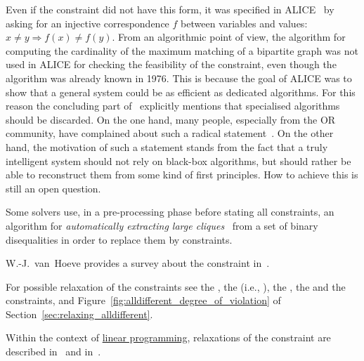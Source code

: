 \begin{ctrdesc}
\item[\pdfmarkup{subject={Remark},color=white,markup=Highlight}{Remark}{Miscellaneous comments about the constraint that do not fit in the other slots.}]
Even if the  constraint did not have this form,
it was specified in ALICE~\cite{Lauriere76,Lauriere78}
by asking for an injective correspondence $f$
between variables and values: $x \neq y \Rightarrow f(x) \neq f(y)$.
From an algorithmic point of view, the algorithm for computing the cardinality of the maximum matching of a bipartite graph
was not used in ALICE for checking the feasibility of the  constraint, even though the algorithm was already known in 1976.
This is because the goal of ALICE was to show that a general system could be as efficient as dedicated
algorithms. For this reason the concluding part of~\cite{Lauriere76} explicitly mentions that specialised algorithms
should be discarded. On the one hand, many people, especially from the OR community, have complained about such
a radical statement~\cite[page 28]{Roy06}. On the other hand, the motivation of such a statement stands from the fact that
a truly intelligent system should not rely on black-box algorithms, but should rather be able to reconstruct them from some
kind of first principles. How to achieve this is still an open question.

Some solvers use, in a pre\nobreakdash-processing phase before stating all constraints,
an algorithm for \emph{automatically extracting large cliques}~\cite{BronKerbosch73,EppsteinStrash11}\marginpar{\bclampe}
from a set of binary disequalities in order to replace them by  constraints.

W.-J.~van~Hoeve provides a survey about the  constraint in~\cite{Hoeve01}.

For possible relaxation of the  constraints see
the \hyperlink{Calldifferent_except_0}{},
the \hyperlink{Ck_alldifferent}{} (i.e., ),
the \hyperlink{Csoft_alldifferent_ctr}{},
the \hyperlink{Csoft_alldifferent_var}{} and
the \hyperlink{Cweighted_partial_alldiff}{} constraints,
and Figure~\ref{fig:alldifferent_degree_of_violation} of Section~\ref{sec:relaxing_alldifferent}.

Within the context of \hyperlink{linear_programming}{linear programming},
relaxations of the  constraint are described
in~\cite{WilliamsYan01} and in~\cite[pages 362--367]{Hooker07book}.


\end{ctrdesc}
